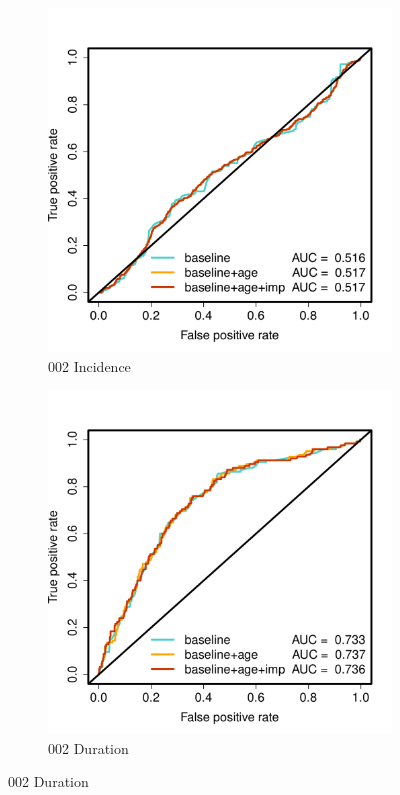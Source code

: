 \documentclass[12pt,twoside]{article}
\begin{document}
 
    \begin{figure}[h]
        \centering
        
        \begin{subfigure}{.475\textwidth}
            \includegraphics[width=\textwidth]{002Incidence_AUC_H1N1.pdf}
            \caption{002 Incidence}
        \end{subfigure}\hfill
                \begin{subfigure}{.475\textwidth}
            \includegraphics[width=\textwidth]{002Duration_AUC_H1N1.pdf}
            \caption{002 Duration}
        \end{subfigure}\hfill
        

\end{figure}
\end{document}
